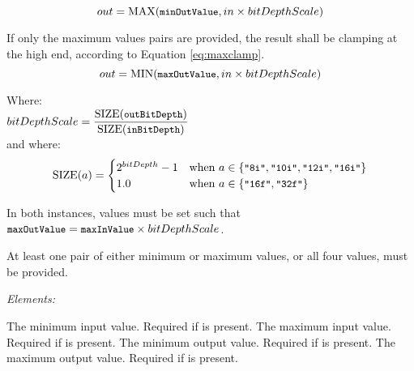 	\begin{equation}\label{eq:minclamp}
		out = \mathrm{MAX}( {\small \texttt{minOutValue}}, in \times bitDepthScale)   
	\end{equation}

If only the maximum values pairs are provided, the result shall be clamping at the high end, according to Equation \ref{eq:maxclamp}.
	\begin{equation}\label{eq:maxclamp}
	    out = \mathrm{MIN}( {\small \texttt{maxOutValue}}, in \times bitDepthScale)
	\end{equation}				

\tabto{0.25in} Where: \\[10pt]
\tabto{0.5in} $bitDepthScale = \dfrac{\mathrm{SIZE}({\small \texttt{outBitDepth}})}{\mathrm{SIZE}({\small \texttt{inBitDepth}})}$\\[14pt] 
\tabto{0.75in}and where: \\[10pt]
\tabto{1.0in} 
\begin{equation*}
\mathrm{SIZE}(a) =
\begin{cases}
    2^{bitDepth}-1 & \text{when }a \in \{{\small \texttt{"8i"}},{\small \texttt{"10i"}},{\small \texttt{"12i"}},{\small \texttt{"16i"}}\} \\
    1.0 & \text{when }a \in \{{\small \texttt{"16f"}},{\small \texttt{"32f"}}\}
\end{cases}
\end{equation*}

In both instances, values must be set such that ${\small \texttt{maxOutValue}} = {\small \texttt{maxInValue}} \times bitDepthScale$.


At least one pair of either minimum or maximum values, or all four values, must be provided.

\emph{Elements:}
\begin{xmlfields}
	\xmlitem[minInValue][optional] The minimum input value. Required if  is present.
	\xmlitem[maxInValue][optional] The maximum input value. Required if  is present.
	\xmlitem[minOutValue][optional] The minimum output value. Required if  is present.
	\xmlitem[maxOutValue][optional] The maximum output value. Required if  is present.
\end{xmlfields}

